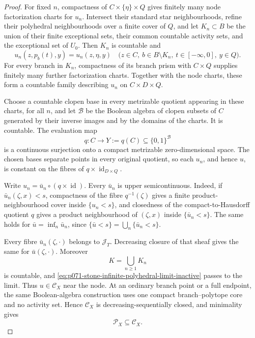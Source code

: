 \begin{proof}
For fixed $n$, compactness of $C\times\{\eta\}\times Q$ gives finitely
many node factorization charts for $u_n$.  Intersect their standard star
neighbourhoods, refine their polyhedral neighbourhoods over a finite cover
of $Q$, and let $K_n\subset B$ be the union of their finite exceptional
sets, their common countable activity sets, and the exceptional set of
$U_0$.  Then $K_n$ is countable and
\begin{equation}
 u_n(z,p_b(t),y)=u_n(z,\eta,y)
 \quad
 \bigl(z\in C,\ b\in B\setminus K_n,\
       t\in[-\infty,0],\ y\in Q\bigr).
 \label{eq:p071-stone-infinite-polyhedral-limit-inactive}
\end{equation}
For every branch in $K_n$, compactness of its branch prism with
$C\times Q$ supplies finitely many further factorization charts.  Together
with the node charts, these form a countable family describing $u_n$ on
$C\times D\times Q$.

Choose a countable clopen base in every metrizable quotient appearing in
these charts, for all $n$, and let $\mathcal B$ be the Boolean algebra of
clopen subsets of $C$ generated by their inverse images and by the domains
of the charts.  It is countable.  The evaluation map
\begin{equation}
 q:C\longrightarrow
 Y:=q(C)\subseteq\{0,1\}^{\mathcal B}
 \label{eq:p071-stone-infinite-polyhedral-common-quotient}
\end{equation}
is a continuous surjection onto a compact metrizable zero-dimensional
space.  The chosen bases separate points in every original quotient, so
each $u_n$, and hence $u$, is constant on the fibres of
$q\times\operatorname{id}_{D\times Q}$.

Write $u_n=\bar u_n\circ(q\times\operatorname{id})$.  Every
$\bar u_n$ is upper semicontinuous.  Indeed, if
$\bar u_n(\zeta,x)<s$, compactness of the fibre $q^{-1}(\zeta)$ gives a
finite product-neighbourhood cover inside $\{u_n<s\}$, and closedness of
the compact-to-Hausdorff quotient $q$ gives a product neighbourhood of
$(\zeta,x)$ inside $\{\bar u_n<s\}$.  The same holds for
$\bar u=\inf_n\bar u_n$, since
$\{\bar u<s\}=\bigcup_n\{\bar u_n<s\}$.

Every fibre $\bar u_n(\zeta,\cdot)$ belongs to $\mathcal J_T$.
Decreasing closure of that sheaf gives the same for
$\bar u(\zeta,\cdot)$.  Moreover
\[
                              K=\bigcup_{n\geq1}K_n
\]
is countable, and
\eqref{eq:p071-stone-infinite-polyhedral-limit-inactive} passes to the
limit.  Thus $u\in\mathcal C_X$ near the node.  At an ordinary branch
point or a full endpoint, the same Boolean-algebra construction uses one
compact branch--polytope core and no activity set.  Hence
$\mathcal C_X$ is decreasing-sequentially closed, and minimality gives
\begin{equation}
                          \mathcal P_X\subseteq\mathcal C_X.
 \label{eq:p071-stone-infinite-polyhedral-minimality}
\end{equation}


\end{proof}
